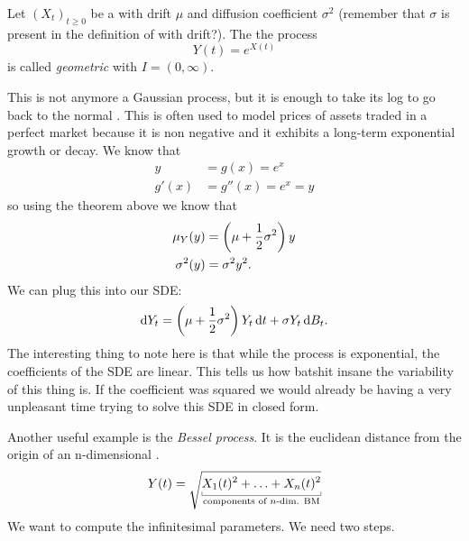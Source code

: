 \documentclass[12pt]{report}
\begin{document}
\begin{definition}
	Let ${(X_{t})}_{t\geq 0}$ be a \bwm{} with drift $\mu$ and diffusion coefficient $\sigma^{2}$ (remember that $\sigma$ is present in the definition of \bwm{} with drift?). The the process 
	\begin{equation*}
		Y(t)=e^{X(t)}
	\end{equation*}
	is called \emph{geometric \bwm{}} with $I=(0,\infty)$.
\end{definition}
This is not anymore a Gaussian process, but it is enough to take its log to go back to the normal \bwm. This is often used to model prices of assets traded in a perfect market because it is non negative and it exhibits a long-term exponential growth or decay. We know that
\begin{align*}
	y&=g(x)=e^{x}\\
	g'(x)&=g''(x)=e^{x}=y
\end{align*}
so using the theorem above we know that
\begin{align*}
	\mu_{Y}(y)&=\left(\mu+\frac{1}{2}\sigma^{2}\right)y\\
	\sigma^{2}(y)&=\sigma^{2}y^{2}.	
\end{align*}
We can plug this into our SDE:
\begin{equation*}
	\mathop{}\!\mathrm{d} Y_{t}=\left(\mu+\frac{1}{2}\sigma^{2}\right)Y_{t}\mathop{}\!\mathrm{d} t+\sigma Y_{t}\mathop{}\!\mathrm{d} B_{t}.
\end{equation*}
The interesting thing to note here is that while the process is exponential, the coefficients of the SDE are linear. This tells us how batshit insane the variability of this thing is. If the coefficient was squared we would already be having a very unpleasant time trying to solve this SDE in closed form.\par
Another useful example is the \emph{Bessel process}. It is the euclidean distance from the origin of an n-dimensional \bwm.
\begin{equation*}
	Y(t)=\sqrt{\ubracketthin{X_{1}(t)^{2}+\ldots+X_{n}(t)^{2}}_{\claptext{components of $n$-dim. BM}}}
\end{equation*}
We want to compute the infinitesimal parameters. We need two steps. 
\end{document}
